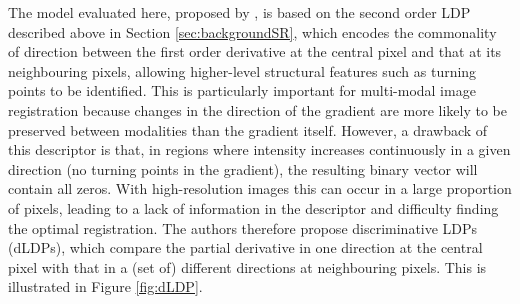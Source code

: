 \documentclass{report}
\begin{document}
The model evaluated here, proposed by \cite{jiang2017fast}, is based on the second order LDP described above in Section \ref{sec:backgroundSR}, which encodes the commonality of direction between the first order derivative at the central pixel and that at its neighbouring pixels, allowing higher-level structural features such as turning points to be identified. This is particularly important for multi-modal image registration because changes in the direction of the gradient are more likely to be preserved between modalities than the gradient itself. However, a drawback of this descriptor is that, in regions where intensity increases continuously in a given direction (no turning points in the gradient), the resulting binary vector will contain all zeros. With high-resolution images this can occur in a large proportion of pixels, leading to a lack of information in the descriptor and difficulty finding the optimal registration. The authors therefore propose discriminative LDPs (dLDPs), which compare the partial derivative in one direction at the central pixel with that in a (set of) different directions at neighbouring pixels. This is illustrated in Figure \ref{fig:dLDP}.
\end{document}
